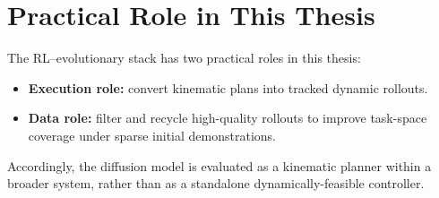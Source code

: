 \section{Practical Role in This Thesis}
\label{sec:rl_evo_practical_role}

The RL--evolutionary stack has two practical roles in this thesis:
\begin{itemize}
    \item \textbf{Execution role:} convert kinematic plans into tracked dynamic rollouts.
    \item \textbf{Data role:} filter and recycle high-quality rollouts to improve task-space coverage under sparse initial demonstrations.
\end{itemize}

Accordingly, the diffusion model is evaluated as a kinematic planner within a broader system, rather than as a standalone dynamically-feasible controller.
